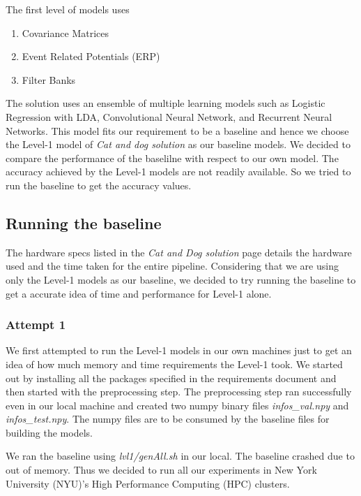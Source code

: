 \documentclass[final,leqno,onefignum,onetabnum]{siamltexmm}
\begin{document}
The first level of models uses 

\begin{enumerate}
  \item Covariance Matrices
  \item Event Related Potentials (ERP)
  \item Filter Banks
\end{enumerate}

The solution uses an ensemble of multiple learning models such as Logistic Regression with LDA, Convolutional Neural Network, and Recurrent Neural Networks.  
This model fits our requirement to be a baseline and hence we choose the Level-1 model of \textit{Cat and dog solution} as our baseline models.
We decided to compare the performance of the baselilne with respect to our own model.
The accuracy achieved by the Level-1 models are not readily available.  So we tried to run the baseline to get the accuracy values.

\subsection{Running the baseline}
The hardware specs listed in the \textit{Cat and Dog solution} page details the hardware used and the time taken for the entire pipeline.  
Considering that we are using only the Level-1 models as our baseline, we decided to try running the baseline to get a accurate idea of time and performance for Level-1 alone.

\subsubsection{Attempt 1}
We first attempted to run the Level-1 models in our own machines just to get an idea of how much memory and time requirements the Level-1 took.
We started out by installing all the packages specified in the requirements document and then started with the preprocessing step.
The preprocessing step ran successfully even in our local machine and created two numpy binary files \textit{infos\_val.npy} and \textit{infos\_test.npy}.
The numpy files are to be consumed by the baseline files for building the models.


We ran the baseline using \textit{lvl1/genAll.sh} in our local.  The baseline crashed due to out of memory.  Thus we decided to run all our experiments in New York University (NYU)'s High Performance Computing (HPC) clusters\cite{website:nyuhpc}.
\end{document}
